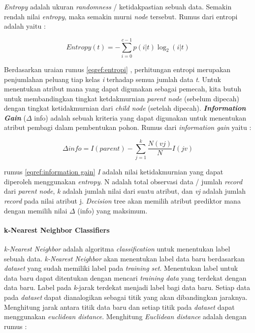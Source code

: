 \documentclass[a4paper,twoside]{article}
\begin{document}
\begin{enumerate}
\textit{Entropy} adalah ukuran \textit{randomness} / ketidakpastian sebuah data. Semakin rendah nilai \textit{entropy}, maka semakin murni \textit{node} tersebut. Rumus dari entropi adalah yaitu :

\begin{equation}
Entropy(t) = - \sum_{i=0}^{c-1} p(i|t)\log_2 (i|t)
\label{eqref:entropi}
\end{equation}

Berdasarkan uraian rumus \eqref{eqref:entropi} , perhitungan entropi merupakan penjumlahan peluang tiap kelas  \textit{i} terhadap semua jumlah data \textit{t}. Untuk menentukan atribut mana yang dapat digunakan sebagai pemecah, kita butuh untuk membandingkan tingkat ketdakmurnian \textit{parent node} (sebelum dipecah) dengan  tingkat ketidakmurnian dari \textit{child node} (setelah dipecah).  \textit{\textbf{Information Gain}} ($\Delta$ info) adalah sebuah kriteria yang dapat digunakan untuk menentukan atribut pembagi dalam pembentukan pohon. Rumus dari \textit{information gain}  yaitu : 

\begin{equation}
  \Delta info = I(parent) - \sum_{j=1}^{k} \frac{N(vj)}{N}I(jv)
  \label{eqref:information gain}
\end{equation}

rumus \eqref{eqref:information gain} \textit{I} adalah nilai ketidakmurnian yang dapat diperoleh menggunakan \textit{entropy}. N adalah total observasi data / jumlah \textit{record} dari \textit{parent node}, \textit{k} adalah jumlah nilai dari suatu atribut, dan \textit{vj} adalah jumlah \textit{record} pada nilai atribut j. \textit{Decision} tree akan memilih atribut prediktor mana dengan memilih nilai $\Delta$ (info) yang maksimum.

\paragraph{k-Nearest Neighbor Classifiers}
 \textit{k-Nearest Neighbor} adalah algoritma \textit{classification} untuk menentukan label sebuah data. \textit{k-Nearest Neighbor} akan menentukan label data baru berdasarkan \textit{dataset} yang sudah memiliki label pada \textit{training set}. Menentukan label untuk data baru dapat ditentukan dengan mencari  \textit{training data} yang terdekat dengan data baru. Label pada \textit{k}-jarak terdekat menjadi label bagi data baru. Setiap data pada \textit{dataset} dapat dianalogikan sebagai titik yang akan dibandingkan jaraknya. Menghitung jarak antara titik data baru dan setiap titik pada \textit{dataset} dapat menggunakan \textit{euclidean distance}. Menghitung \textit{Euclidean distance} adalah dengan rumus : 


\end{enumerate}
\end{document}
